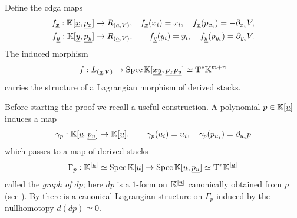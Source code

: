 \begin{prp} \label{prp:e-1cells}
	Define the cdga maps
	\begin{align*}
		f_{\underline{x}} : \mathbb{K}[\underline{x}, \underline{p_x}] & \to R_{(\underline{a},V)}, & f_{\underline{x}}(x_i) = x_i, \quad f_{\underline{x}}(p_{x_i}) = -\partial_{x_i} V, \\
		f_{\underline{y}} : \mathbb{K}[\underline{y}, \underline{p_y}] & \to R_{(\underline{a},V)}, & f_{\underline{y}}(y_i) = y_i, \quad f_{\underline{y}}(p_{y_i}) = \partial_{y_i} V.
	\end{align*}
	The induced morphism
	\begin{equation*}
		f : L_{(\underline{a},V)} \to \operatorname{Spec} \mathbb{K}[\underline{xy}, \underline{p_x p_y}] \simeq \mathrm{T}^\ast \mathbb{K}^{m+n}
	\end{equation*}
	carries the structure of a Lagrangian morphism of derived stacks.
\end{prp}

Before starting the proof we recall a useful construction. A polynomial $p \in \mathbb{K}[\underline{u}]$ induces a map
\begin{equation*}
	\gamma_p : \mathbb{K}[\underline{u}, \underline{p_u}] \to \mathbb{K}[\underline{u}], \qquad \gamma_p(u_i) = u_i, \quad \gamma_p(p_{u_i}) = \partial_{u_i} p
\end{equation*}
which passes to a map of derived stacks
\begin{equation*}
	\Gamma_p : \mathbb{K}^{\left\lvert \underline{u} \right\rvert} \simeq \operatorname{Spec} \mathbb{K}[\underline{u}] \to \operatorname{Spec} \mathbb{K}[\underline{u}, \underline{p_u}] \simeq \mathrm{T}^\ast \mathbb{K}^{\left\lvert \underline{u} \right\rvert}
\end{equation*}
called the \emph{graph of $dp$}; here $dp$ is a $1$-form on $\mathbb{K}^{\left\lvert \underline{u} \right\rvert}$ canonically obtained from $p$ (see \cite{Calaque2015}). By \cite[Theorem 2.15]{Calaque2019} there is a canonical Lagrangian structure on $\Gamma_p$ induced by the nullhomotopy $d(dp) \simeq 0$.

